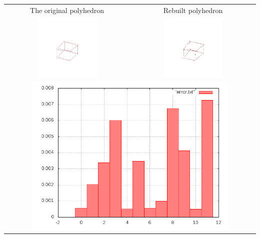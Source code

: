 \documentclass[11pt,fleqn,a4paper]{scrartcl}
\begin{document}
\begin{center}

\begin{tabular}{|c|c|}
\hline
The original polyhedron& Rebuilt polyhedron \\
\includegraphics[width=0.5\textwidth]{variant2/images/5/input.png} &
\includegraphics[width=0.5\textwidth]{variant2/images/5/out.png} \\
\midrule
\multicolumn{2}{|c|}{ \includegraphics[width=0.8\textwidth]{variant2/images/5/error.png}} \\
\hline
\end{tabular}
\end{center}
\newpage
\end{document}

